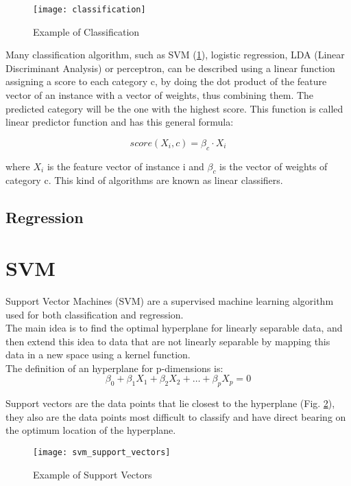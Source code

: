 \begin{figure}[H]
	\centering
	\texttt{[image: classification]}
	\caption{Example of Classification \cite{}}
	\label{fig:classification}
\end{figure}	

Many classification algorithm, such as SVM (\ref{svm}), logistic regression, LDA (Linear Discriminant Analysis) or perceptron, can be described using a linear function assigning a score to each category c, by doing the dot product of the feature vector of an instance with a vector of weights, thus combining them. The predicted category will be the one with the highest score. This function is called linear predictor function and has this general formula:

\begin{equation}
score(X_i, c) = \beta_c \cdot X_i
\end{equation}

where $X_i$ is the feature vector of instance i and $\beta_c$ is the vector of weights of category c. This kind of algorithms are known as linear classifiers.

\subsection{Regression} \label{regression}

\pagebreak

\section{SVM} \label{svm}
Support Vector Machines (SVM) are a supervised machine learning algorithm used for both classification and regression. \\
The main idea is to find the optimal hyperplane for linearly separable data, and then extend this idea to data that are not linearly separable by mapping this data in a new space using a kernel function.\\
The definition of an hyperplane for p-dimensions is:
\begin{equation}
\beta_0 + \beta_1 X_1 + \beta_2 X_2 + \dots + \beta_p X_p = 0
\end{equation}

Support vectors are the data points that lie closest to the hyperplane (Fig. \ref{fig:suppvec}), they also are the data points most difficult to classify and have direct bearing on the optimum location of the hyperplane.\\
\begin{figure}[h]
	\centering
	\texttt{[image: svm\_support\_vectors]}
	\caption{Example of Support Vectors}
	\label{fig:suppvec}
\end{figure}

